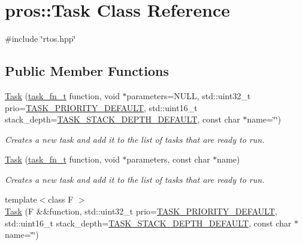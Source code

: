 \hypertarget{classpros_1_1Task}{}\section{pros\+:\+:Task Class Reference}
\label{classpros_1_1Task}


{\ttfamily \#include \char`\"{}rtos.\+hpp\char`\"{}}

\subsection*{Public Member Functions}
\begin{DoxyCompactItemize}
\item 
\hyperlink{classpros_1_1Task_a938ee60b49f29d743315bf05ee9f4a56}{Task} (\hyperlink{rtos_8h_aece0aa29b1f1538115228d2197239f98}{task\+\_\+fn\+\_\+t} function, void $\ast$parameters=N\+U\+LL, std\+::uint32\+\_\+t prio=\hyperlink{rtos_8h_a3082a7e8f15691441dba683711bb823f}{T\+A\+S\+K\+\_\+\+P\+R\+I\+O\+R\+I\+T\+Y\+\_\+\+D\+E\+F\+A\+U\+LT}, std\+::uint16\+\_\+t stack\+\_\+depth=\hyperlink{rtos_8h_a9ffb33b9e3714ca949d9f45dde3cbf8f}{T\+A\+S\+K\+\_\+\+S\+T\+A\+C\+K\+\_\+\+D\+E\+P\+T\+H\+\_\+\+D\+E\+F\+A\+U\+LT}, const char $\ast$name=\char`\"{}\char`\"{})
\begin{DoxyCompactList}\small\item\em Creates a new task and add it to the list of tasks that are ready to run. \end{DoxyCompactList}\item 
\hyperlink{classpros_1_1Task_a64608b28832c40cf11ddb350a7331a08}{Task} (\hyperlink{rtos_8h_aece0aa29b1f1538115228d2197239f98}{task\+\_\+fn\+\_\+t} function, void $\ast$parameters, const char $\ast$name)
\begin{DoxyCompactList}\small\item\em Creates a new task and add it to the list of tasks that are ready to run. \end{DoxyCompactList}\item 
{\footnotesize template$<$class F $>$ }\\\hyperlink{classpros_1_1Task_a6574af1a29f3031904fc75bf67563c00}{Task} (F \&\&function, std\+::uint32\+\_\+t prio=\hyperlink{rtos_8h_a3082a7e8f15691441dba683711bb823f}{T\+A\+S\+K\+\_\+\+P\+R\+I\+O\+R\+I\+T\+Y\+\_\+\+D\+E\+F\+A\+U\+LT}, std\+::uint16\+\_\+t stack\+\_\+depth=\hyperlink{rtos_8h_a9ffb33b9e3714ca949d9f45dde3cbf8f}{T\+A\+S\+K\+\_\+\+S\+T\+A\+C\+K\+\_\+\+D\+E\+P\+T\+H\+\_\+\+D\+E\+F\+A\+U\+LT}, const char $\ast$name=\char`\"{}\char`\"{})

\end{DoxyCompactItemize}

